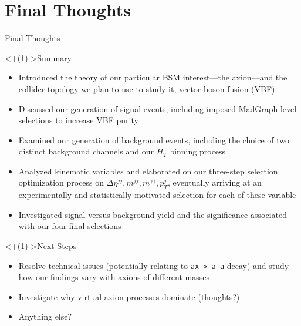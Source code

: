 \documentclass[]{beamer}
\begin{document}
%
%
\section{Final Thoughts}

\begin{frame}[label=current]{Final Thoughts}
    \begin{block}<+(1)->{Summary}
        \begin{itemize}
            \item Introduced the theory of our particular BSM interest---the axion---and the collider topology we plan to use to study it, vector boson fusion (VBF)
            \item Discussed our generation of signal events, including imposed MadGraph-level selections to increase VBF purity
            \item Examined our generation of background events, including the choice of two distinct background channels and our $H_T$ binning process
            \item Analyzed kinematic variables and elaborated on our three-step selection optimization process on $\Delta \eta^{jj}, m^{jj}, m^{\gamma \gamma}, p_T^j$, eventually arriving at an experimentally and statistically motivated selection for each of these variable
            \item Investigated signal versus background yield and the significance associated with our four final selections
        \end{itemize}
    \end{block}
    
    \bigskip
    
    \begin{block}<+(1)->{Next Steps}
            \begin{itemize}
                \item Resolve technical issues (potentially relating to \texttt{ax > a a} decay) and study how our findings vary with axions of different masses
                \item Investigate why virtual axion processes dominate (thoughts?)
                \item Anything else?
            \end{itemize}
    \end{block}
\end{frame}
\end{document}
